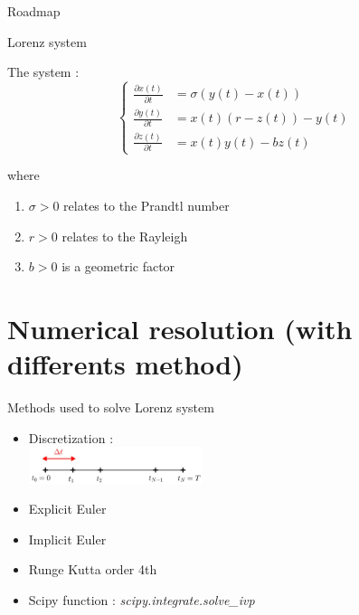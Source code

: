 \documentclass[10pt,xcolor={table,dvipsnames},t]{beamer}
\begin{document}
	\begin{frame}{Roadmap}
		
	\end{frame}
	
	
	\begin{frame}{Lorenz system}
		
		The system :
		$$\left\{\begin{aligned} 
			\frac{\partial x(t)}{\partial t} &=\sigma(y(t)-x(t))\\
			\frac{\partial y(t)}{\partial t}&=x(t)(r-z(t))-y(t) \\
			\frac{\partial z(t)}{\partial t}&=x(t)y(t)-bz(t)
		\end{aligned}\right.$$
	
		where
		
		\begin{enumerate}[\textbullet]
			\item $\sigma > 0$  relates to the Prandtl number
			\item $r > 0$  relates to the Rayleigh
			\item $b > 0$ is a geometric factor
		\end{enumerate}
		
	\end{frame}

	\section{Numerical resolution (with differents method)}
	
	\begin{frame}{Methods used to solve Lorenz system}
		
		\begin{itemize}
			\item Discretization : \\
			\qquad \includegraphics[width=0.4\textwidth]{images/discretization.jpg} \\
			\item Explicit Euler
			\item Implicit Euler			
			\item Runge Kutta order 4th			
			\item Scipy function : \qquad \textit{scipy.integrate.solve\_ivp}
		\end{itemize}
		
	\end{frame}
	
\end{document}
